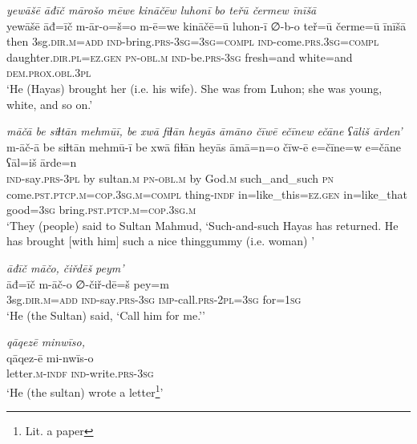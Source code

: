 \ea \label{ŽH.65}
\textit{yewāšē āđīč mārošo mēwe kināčēw luhonī bo teřū čermew īnīšā} \\ 
\gll yewāšē āđ=īč m-ār-o=š=o m-ē=we kināčē=ū luhon-ī ∅-b-o teř=ū čerme=ū īnīšā \\ 
 then 3sg\textsc{.dir}\textsc{.m}\textsc{=add} \textsc{ind-}bring\textsc{.prs}\textsc{-3sg}\textsc{=3sg}\textsc{=compl} \textsc{ind-}come\textsc{.prs}\textsc{.3sg}\textsc{=compl} daughter\textsc{.dir}\textsc{.pl}\textsc{=ez}\textsc{.gen} \textsc{pn}\textsc{-obl}\textsc{.m} \textsc{ind-}be\textsc{.prs}\textsc{-3sg} fresh=and white=and \textsc{dem.prox}\textsc{.obl}\textsc{.3pl} \\ 
\glt `He (Hayas) brought her (i.e. his wife). She was from Luhon; she was young, white, and so on.'
\z 
 
\ea \label{ŽH.66}
\textit{māčā be siɫtān mehmūī, be xwā fiɫān heyās āmāno čīwē ečīnew ečāne ʕāliš ārden’} \\ 
\gll m-āč-ā be siɫtān mehmū-ī be xwā fiɫān heyās āmā=n=o čīw-ē e=čīne=w e=čāne ʕāl=iš ārde=n \\ 
 \textsc{ind-}say\textsc{.prs}\textsc{-3pl} by sultan\textsc{.m} \textsc{pn}\textsc{-obl}\textsc{.m} by God\textsc{.m} such\_and\_such \textsc{pn} come\textsc{.pst}\textsc{.ptcp}\textsc{.m}\textsc{=cop}\textsc{.3sg}\textsc{.m}\textsc{=compl} thing\textsc{-indf} in=like\_this\textsc{=ez}\textsc{.gen} in=like\_that good\textsc{=3sg} bring\textsc{.pst}\textsc{.ptcp}\textsc{.m}\textsc{=cop}\textsc{.3sg}\textsc{.m} \\ 
\glt `They (people) said to Sultan Mahmud, ‘Such-and-such Hayas has returned. He has brought [with him] such a nice thinggummy (i.e. woman)  '
\z 
 
\ea \label{ŽH.67}
\textit{āđīč māčo, čiřdēš peym’} \\ 
\gll āđ=īč m-āč-o ∅-čiř-dē=š pey=m \\ 
 3sg\textsc{.dir}\textsc{.m}\textsc{=add} \textsc{ind-}say\textsc{.prs}\textsc{-3sg} \textsc{imp-}call\textsc{.prs}\textsc{-2pl}\textsc{=3sg} for\textsc{=1sg} \\ 
\glt `He (the Sultan) said, ‘Call him for me.’'
\z 
 
\ea \label{ŽH.68}
\textit{qāqezē minwīso,} \\ 
\gll qāqez-ē mi-nwīs-o \\ 
 letter\textsc{.m}\textsc{-indf} \textsc{ind-}write\textsc{.prs}\textsc{-3sg} \\ 
\glt `He (the sultan) wrote a letter\footnote{Lit. a paper}'
\z 
 
